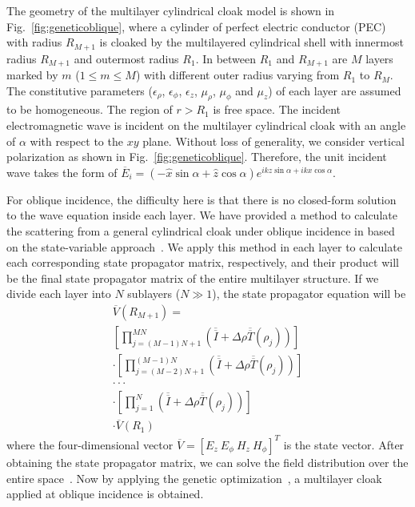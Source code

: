 \documentclass[12pt]{article} %
\begin{document}
The geometry of the multilayer cylindrical cloak model is shown in
Fig.~\ref{fig:geneticoblique}, where a cylinder of perfect electric
conductor (PEC) with radius $R_{M+1}$ is cloaked by the multilayered
cylindrical shell with innermost radius $R_{M+1}$ and outermost
radius $R_1$. In between $R_1$ and $R_{M+1}$ are $M$ layers marked
by $m$ ($1\leq m \leq M$) with different outer radius varying from
$R_1$ to $R_M$. The constitutive parameters ($\epsilon_\rho$,
$\epsilon_\phi$, $\epsilon_z$, $\mu_\rho$, $\mu_\phi$ and $\mu_z$)
of each layer are assumed to be homogeneous. The region of $r>R_1$
is free space. The incident electromagnetic wave is incident on the
multilayer cylindrical cloak with an angle of $\alpha$ with respect
to the $xy$ plane. Without loss of generality, we consider vertical
polarization as shown in Fig.~\ref{fig:geneticoblique}. Therefore,
the unit incident wave takes the form of $\overline{E}_i =(-\hat x
\sin \alpha + \hat z \cos \alpha) e^{ikz \sin \alpha + ikx\cos
\alpha}$.


For oblique incidence, the difficulty here is that there is no
closed-form solution to the wave equation inside each layer. We have
provided a method to calculate the scattering from a general
cylindrical cloak under oblique incidence in \cite{baile_oe1} based
on the state-variable approach~\cite{weng}. We apply this method in
each layer to calculate each corresponding state propagator matrix,
respectively, and their product will be the final state propagator
matrix of the entire multilayer structure. If we divide each layer
into $N$ sublayers ($N\gg 1$), the state propagator equation will be
\begin{eqnarray}
&\overline V (R_{M+1}) = \nonumber & \\
&\left[ \prod_{j=(M-1)N+1}^{MN}(\overline{\overline I} + \Delta \rho
\overline{\overline T}(\rho_{j})) \right] & \nonumber
\\
&\cdot \left[ \prod_{j=(M-2)N+1}^{(M-1)N}(\overline{\overline I} +
\Delta \rho \overline{\overline T}(\rho_{j})) \right]&\nonumber
\\
&\cdot \cdot \cdot & \nonumber
\\
 & \cdot \left[
\prod_{j=1}^{N}(\overline{\overline I} + \Delta \rho
\overline{\overline T}(\rho_{j})) \right]&\nonumber \\
&\cdot \overline V (R_1)&
\end{eqnarray}
where the four-dimensional vector $\overline V = [E_z ~E_\phi ~H_z
~H_\phi]^T$ is the state vector. After obtaining the state
propagator matrix, we can solve the field distribution over the
entire space~\cite{baile_oe1}. Now by applying the genetic
optimization~\cite{xi_optimization}, a multilayer cloak applied at
oblique incidence is obtained.
\end{document}
